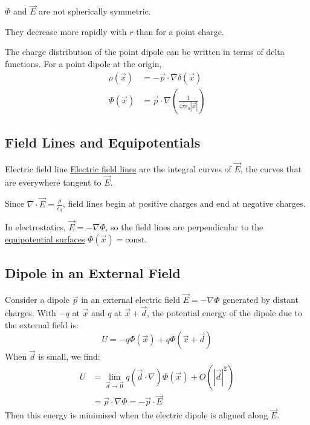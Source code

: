 \documentclass[../Main.tex]{subfiles}
\begin{document}
\begin{remarks}
    \item $\Phi$ and $\vec{E}$ are not spherically symmetric.
    \item They decrease more rapidly with $r$ than for a point charge.
\end{remarks}
The charge distribution of the point dipole can be written in terms of delta functions. For a point dipole at the origin,
\begin{align*}
    \rho(\vec{x}) &= -\vec{p} \cdot \nabla \delta(\vec{x}) \\
    \Phi(\vec{x}) &= \vec{p} \cdot \nabla \left(\frac{1}{4\pi \epsilon_0 |\vec{x}|}\right)
\end{align*}
\subsection{Field Lines and Equipotentials}
\begin{definition}{Electric field line}
    \underline{Electric field lines} are the integral curves of $\vec{E}$, the curves that are everywhere tangent to $\vec{E}$.
\end{definition}
\begin{remarks}
    \item Since $\nabla \cdot \vec{E} = \frac{\rho}{\epsilon_0}$, field lines begin at positive charges and end at negative charges.
    \item In electrostatics, $\vec{E} = -\nabla \Phi$, so the field lines are perpendicular to the \underline{equipotential surfaces} $\Phi(\vec{x}) = \text{const}$.
\end{remarks}
\subsection{Dipole in an External Field}
Consider a dipole $\vec{p}$ in an external electric field $\vec{E} = -\nabla \Phi$ generated by distant charges. With $-q$ at $\vec{x}$ and $q$ at $\vec{x} + \vec{d}$, the potential energy of the dipole due to the external field is:
\begin{equation*}
    U = -q \Phi(\vec{x}) + q \Phi(\vec{x} + \vec{d})
\end{equation*}
When $\vec{d}$ is small, we find:
\begin{align*}
    U &=\lim_{\vec{d} \to \vec0} q (\vec{d} \cdot \nabla) \Phi(\vec{x}) + O(|\vec{d}|^2) \\
    &= \vec{p} \cdot \nabla \Phi = -\vec{p} \cdot \vec{E}
\end{align*}
Then this energy is minimised when the electric dipole is aligned along $\vec{E}$.
\end{document}
